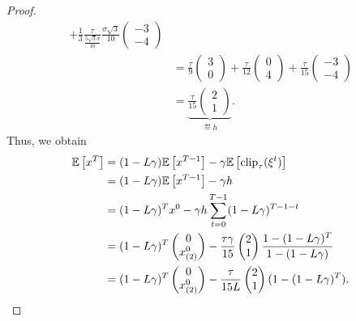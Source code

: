\documentclass[a4paper,11pt]{article}
\begin{document}
\begin{proof}
\begin{align*}
        + \frac{1}{3}\frac{\tau}{\frac{5\sqrt{3}\sigma}{10}}\frac{\sigma\sqrt{3}}{10}\begin{pmatrix}
            -3 \\ -4
        \end{pmatrix}\\
        &= \frac{\tau}{9}\begin{pmatrix}
            3 \\ 0
        \end{pmatrix}
        + \frac{\tau}{12}\begin{pmatrix}
            0 \\ 4
        \end{pmatrix}
        + \frac{\tau}{15}\begin{pmatrix}
            -3 \\ -4
        \end{pmatrix}\\
        &= \underbrace{\frac{\tau}{15}\begin{pmatrix}
            2 \\ 1
        \end{pmatrix}}_{\eqdef h}.
    \end{align*}
    Thus, we obtain
    \begin{align*}
        \mathbb{E}\left[x^T\right] &= (1-L\gamma)\mathbb{E}\left[x^{T-1}\right] - \gamma\mathbb{E}\left[\operatorname{clip}_{\tau}(\xi^t)\right]\\
        &= (1-L\gamma)\mathbb{E}\left[x^{T-1}\right] - \gamma h\\
        &= (1-L\gamma)^Tx^0 - \gamma h \sum_{t=0}^{T-1}(1-L\gamma)^{T-1-t}\\
        &= (1-L\gamma)^T\begin{pmatrix}
            0 \\ x_{(2)}^0
        \end{pmatrix} - \frac{\tau\gamma}{15}\begin{pmatrix}
            2 \\ 1
        \end{pmatrix}  \frac{1-(1-L\gamma)^T}{1 - (1-L\gamma)}\\
        &= (1-L\gamma)^T\begin{pmatrix}
            0 \\ x_{(2)}^0
        \end{pmatrix} - \frac{\tau}{15L}\begin{pmatrix}
            2 \\ 1
        \end{pmatrix} (1-(1-L\gamma)^T).
    \end{align*}


\end{proof}
\end{document}
